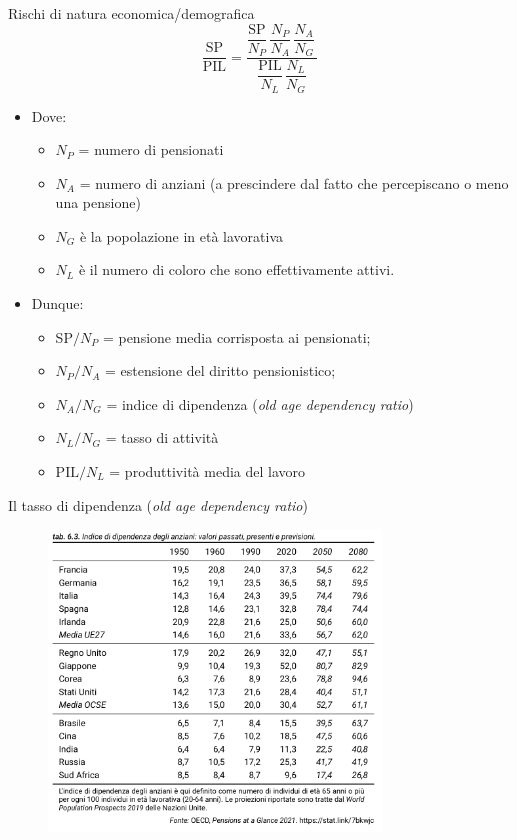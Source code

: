 \documentclass[11pt]{beamer}
\begin{document}
\begin{frame}{Rischi di natura economica/demografica}
\begin{equation*}
  \frac{\text{SP}}{\text{PIL}} =\frac{\dfrac{\text{SP}}{N_P}\,\dfrac{N_P}{N_A}\,\dfrac{N_A}{N_G}\,}
  {\dfrac{\text{PIL}}{N_L}\,\dfrac{N_L}{N_G}}
\end{equation*}

\begin{itemize}
\item Dove:
\begin{itemize}
\item $N_P$ = numero di pensionati
\item $N_A$ = numero di anziani (a prescindere dal fatto che percepiscano o meno una pensione)
\item $N_G$ è la popolazione in età lavorativa
\item $N_L$ è il numero di coloro che sono effettivamente attivi.
\end{itemize}
\item Dunque:
\begin{itemize}
\item SP$/N_P$ = pensione media corrisposta ai pensionati;
\item $N_P/N_A$ = estensione del diritto pensionistico;
\item $N_A/N_G$ = indice di dipendenza (\emph{old age dependency ratio})
\item $N_L/N_G$ = tasso di attività
\item $\text{PIL}/N_L$ = produttività media del lavoro
\end{itemize}
\end{itemize}
\end{frame}


\begin{frame}{Il tasso di dipendenza  (\emph{old age dependency ratio})}
\begin{figure}[htbp]
\centering
\includegraphics[height=8cm]{./figure/old-age-dependency-ratio.png}
\end{figure}
\end{frame}
\end{document}
